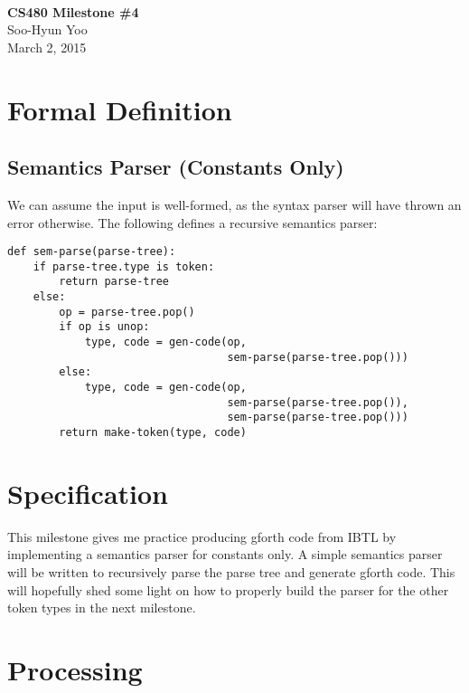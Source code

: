 \documentclass[12pt,letterpaper]{article}
\begin{document}
\fancyfoot{}
\begin{center}
    \hfill \\
    \vspace{4in}
    {\bf\Huge CS480 Milestone \#4 \\}
    \vspace{2in}
    {\Large Soo-Hyun Yoo \\ March 2, 2015}
\end{center}

\newpage
{}

\section*{Formal Definition}

\subsection*{Semantics Parser (Constants Only)}

We can assume the input is well-formed, as the syntax parser will have thrown
an error otherwise. The following defines a recursive semantics parser:

\begin{verbatim}
def sem-parse(parse-tree):
    if parse-tree.type is token:
        return parse-tree
    else:
        op = parse-tree.pop()
        if op is unop:
            type, code = gen-code(op,
                                  sem-parse(parse-tree.pop()))
        else:
            type, code = gen-code(op,
                                  sem-parse(parse-tree.pop()),
                                  sem-parse(parse-tree.pop()))
        return make-token(type, code)
\end{verbatim}

\section*{Specification}

This milestone gives me practice producing gforth code from IBTL by
implementing a semantics parser for constants only. A simple semantics parser
will be written to recursively parse the parse tree and generate gforth code.
This will hopefully shed some light on how to properly build the parser for the
other token types in the next milestone.

\section*{Processing}
\end{document}
